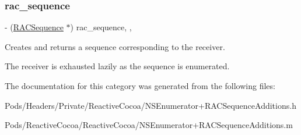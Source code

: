 \subsubsection{\texorpdfstring{rac\+\_\+sequence}{rac\_sequence}}
{\footnotesize\ttfamily -\/ (\mbox{\hyperlink{interface_r_a_c_sequence}{R\+A\+C\+Sequence}} $\ast$) rac\+\_\+sequence\hspace{0.3cm}{\ttfamily [read]}, {\ttfamily [nonatomic]}, {\ttfamily [copy]}}

Creates and returns a sequence corresponding to the receiver.

The receiver is exhausted lazily as the sequence is enumerated. 

The documentation for this category was generated from the following files\+:\begin{DoxyCompactItemize}
\item 
Pods/\+Headers/\+Private/\+Reactive\+Cocoa/N\+S\+Enumerator+\+R\+A\+C\+Sequence\+Additions.\+h\item 
Pods/\+Reactive\+Cocoa/\+Reactive\+Cocoa/N\+S\+Enumerator+\+R\+A\+C\+Sequence\+Additions.\+m\end{DoxyCompactItemize}
